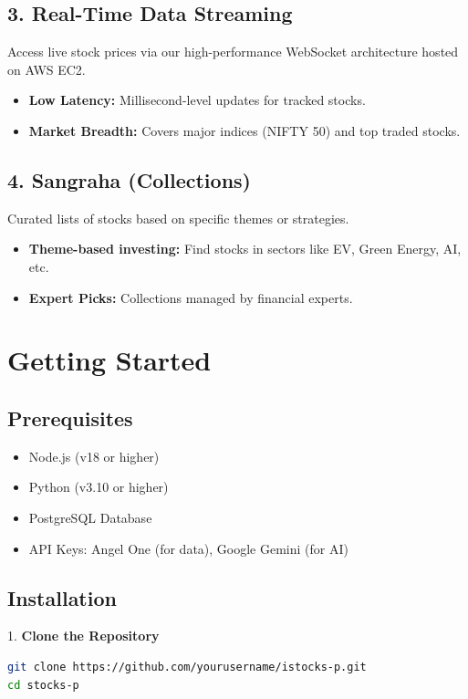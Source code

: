 \documentclass[a4paper,12pt]{article}
\begin{document}
\subsection{3. Real-Time Data Streaming}
Access live stock prices via our high-performance WebSocket architecture hosted on AWS EC2.
\begin{itemize}
    \item \textbf{Low Latency:} Millisecond-level updates for tracked stocks.
    \item \textbf{Market Breadth:} Covers major indices (NIFTY 50) and top traded stocks.
\end{itemize}

\subsection{4. Sangraha (Collections)}
Curated lists of stocks based on specific themes or strategies.
\begin{itemize}
    \item \textbf{Theme-based investing:} Find stocks in sectors like EV, Green Energy, AI, etc.
    \item \textbf{Expert Picks:} Collections managed by financial experts.
\end{itemize}

\section{Getting Started}

\subsection{Prerequisites}
\begin{itemize}
    \item Node.js (v18 or higher)
    \item Python (v3.10 or higher)
    \item PostgreSQL Database
    \item API Keys: Angel One (for data), Google Gemini (for AI)
\end{itemize}

\subsection{Installation}

1. \textbf{Clone the Repository}
\begin{lstlisting}[language=bash]
git clone https://github.com/yourusername/istocks-p.git
cd stocks-p
\end{lstlisting}
\end{document}
